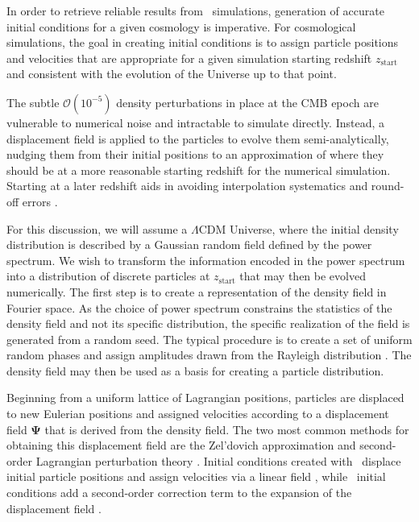 In order to retrieve reliable results from \nbody\ simulations, generation of accurate initial conditions for a given cosmology is imperative.  For cosmological simulations, the goal in creating initial conditions is to assign particle positions and velocities that are appropriate for a given simulation starting redshift $z_{\mathrm{start}}$ and consistent with the evolution of the Universe up to that point.

The subtle $\mathcal{O}(10^{-5})$ density perturbations in place at the CMB epoch are vulnerable to numerical noise and intractable to simulate directly.  Instead, a displacement field is applied to the particles to evolve them semi-analytically, nudging them from their initial positions to an approximation of where they should be at a more reasonable starting redshift for the numerical simulation.  Starting at a later redshift aids in avoiding interpolation systematics and round-off errors \citep{2007ApJ...671.1160L}.

For this discussion, we will assume a $\Lambda$CDM Universe, where the initial density distribution is described by a Gaussian random field defined by the power spectrum.  We wish to transform the information encoded in the power spectrum into a distribution of discrete particles at $z_{\mathrm{start}}$ that may then be evolved numerically.  The first step is to create a representation of the density field in Fourier space.  As the choice of power spectrum constrains the statistics of the density field and not its specific distribution, the specific realization of the field is generated from a random seed.  The typical procedure is to create a set of uniform random phases and assign amplitudes drawn from the Rayleigh distribution \citep{1985ApJS...57..241E}.  The density field may then be used as a basis for creating a particle distribution.

Beginning from a uniform lattice of Lagrangian positions, particles are displaced to new Eulerian positions and assigned velocities according to a displacement field $\boldsymbol{\Psi}$ that is derived from the density field.  The two most common methods for obtaining this displacement field are the Zel'dovich approximation \citep[\za,][]{1970A&A.....5...84Z} and second-order Lagrangian perturbation theory \citep[\lpt,][]{1994MNRAS.267..811B, 1994A&A...288..349B, 1995A&A...296..575B, 1998MNRAS.299.1097S}.  Initial conditions created with \za\ displace initial particle positions and assign velocities via a linear field \citep{1983MNRAS.204..891K, 1985ApJS...57..241E}, while \lpt\ initial conditions add a second-order correction term to the expansion of the displacement field \citep{1998MNRAS.299.1097S, 2005ApJ...634..728S, 2010MNRAS.403.1859J}.



